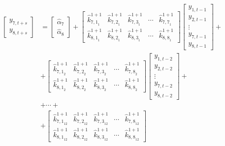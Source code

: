 \documentclass[a4paper,11pt,listof=nochaptergap,oneside,pointednumbers,bibtotoc,bigheadings,liststotoc]{scrbook}
\theoremstyle{mysatz}
\theoremstyle{mydefinition}
\theoremstyle{mybemerkung}
\let\oldhat\hat
\newcommand{\hattnobf}[1]{\oldhat{#1}}
\begin{document}
\begin{itemize}
\begin{enumerate}
\begin{equation} \label{eq:localproj46}
\begin{split}
		\begin{bmatrix}
		y_{7, t+s} \\
		y_{8,t+s}
 		\end{bmatrix} & = 
		\begin{bmatrix}
		\hattnobf{\alpha}_{{7}} \\
		\hattnobf{\alpha}_{{8}}
 		\end{bmatrix} + 
		\begin{bmatrix}
		{\hattnobf{k}_{{7, 1}_1}^{1+1}} & {\hattnobf{k}_{{7, 2}_1}^{1+1}} & {\hattnobf{k}_{{7, 3}_1}^{1+1}} & \cdots & {\hattnobf{k}_{{7, 7}_1}^{1+1}}\\
		{\hattnobf{k}_{{8, 1}_1}^{1+1}} & {\hattnobf{k}_{{8, 2}_1}^{1+1}} & {\hattnobf{k}_{{8, 3}_1}^{1+1}} & \cdots & {\hattnobf{k}_{{8, 8}_1}^{1+1}}
 		\end{bmatrix} 
		\begin{bmatrix}
    		y_{1,t-1} \\
    		y_{2,t-1} \\
		\vdots \\
		y_{7, t-1} \\
		y_{8, t-1}
 		\end{bmatrix} + \\
		& +
		\begin{bmatrix}
		{\hattnobf{k}_{{7, 1}_2}^{1+1}} & {\hattnobf{k}_{{7, 2}_2}^{1+1}} & {\hattnobf{k}_{{7, 3}_2}^{1+1}} & \cdots & {\hattnobf{k}_{{7, 8}_2}^{1+1}}\\
		{\hattnobf{k}_{{8, 1}_2}^{1+1}} & {\hattnobf{k}_{{8, 2}_2}^{1+1}} & {\hattnobf{k}_{{8, 3}_2}^{1+1}} & \cdots & {\hattnobf{k}_{{8, 8}_2}^{1+1}}
 		\end{bmatrix} 
		\begin{bmatrix}
    		y_{1,t-2} \\
    		y_{2,t-2} \\
		\vdots \\
		y_{7, t-2} \\
		y_{8, t-2}
 		\end{bmatrix} +\\
		& + \cdots + \\
		& + 
		\begin{bmatrix}
    		{\hattnobf{k}_{{7, 1}_{12}}^{1+1}} & {\hattnobf{k}_{{7, 2}_{12}}^{1+1}} & {\hattnobf{k}_{{7, 3}_{12}}^{1+1}} & \cdots & {\hattnobf{k}_{{7, 8}_{12}}^{1+1}}\\
		{\hattnobf{k}_{{8, 1}_{12}}^{1+1}} & {\hattnobf{k}_{{8, 2}_{12}}^{1+1}} & {\hattnobf{k}_{{8, 3}_{12}}^{1+1}} & \cdots & {\hattnobf{k}_{{8, 8}_{12}}^{1+1}}

\end{bmatrix}
\end{split}
\end{equation}
\end{enumerate}
\end{itemize}
\end{document}

